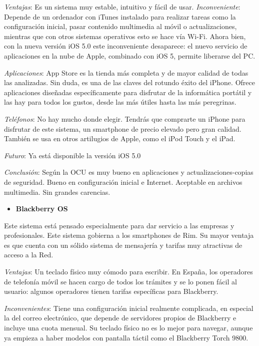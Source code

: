 \documentclass[12 pt, a4paper, twoside]{article}
\begin{document}
\emph{Ventajas}: Es un sistema muy estable, intuitivo y fácil de usar.
\emph{Inconveniente}: Depende de un ordenador con iTunes instalado
para realizar tareas como la configuración inicial, pasar contenido
multimedia al móvil o actualizaciones, mientras que con otros sistemas
operativos esto se hace vía Wi-Fi. Ahora bien, con la nueva versión
iOS 5.0 este inconveniente desaparece: el nuevo servicio de
aplicaciones en la nube de Apple, combinado con iOS 5, permite
liberarse del PC.

\emph{Aplicaciones}: App Store es la tienda más completa y de mayor
calidad de todas las analizadas. Sin duda, es una de las claves del
rotundo éxito del iPhone. Ofrece aplicaciones diseñadas
específicamente para disfrutar de la informática portátil y las hay
para todos los gustos, desde las más útiles hasta las más peregrinas.

\emph{Teléfonos}: No hay mucho donde elegir. Tendrás que comprarte
un iPhone para disfrutar de este sistema, un smartphone de precio
elevado pero gran calidad. También se usa en otros artilugios de
Apple, como el iPod Touch y el iPad.

\emph{Futuro}: Ya está disponible la versión iOS 5.0

\emph{Conclusión}: Según la OCU es muy bueno en aplicaciones y
actualizaciones-copias de seguridad. Bueno en configuración inicial e
Internet. Aceptable en archivos multimedia. Sin grandes carencias.


\begin{itemize}
\item \textbf{Blackberry OS}
\end{itemize}

Este sistema está pensado especialmente para dar servicio a las
empresas y profesionales. Este sistema gobierna a los smartphones de
Rim. Su mayor ventaja es que cuenta con un sólido sistema de
mensajería y tarifas muy atractivas de acceso a la Red.

\emph{Ventajas}: Un teclado físico muy cómodo para escribir. En
España, los operadores de telefonía móvil se hacen cargo de todos los
trámites y se lo ponen fácil al usuario: algunos operadores tienen
tarifas específicas para Blackberry.

\emph{Inconvenientes}: Tiene una configuración inicial realmente
complicada, en especial la del correo electrónico, que depende de
servidores propios de Blackberry e incluye una cuota mensual. Su
teclado físico no es lo mejor para navegar, aunque ya empieza a haber
modelos con pantalla táctil como el Blackberry Torch 9800.
\end{document}
